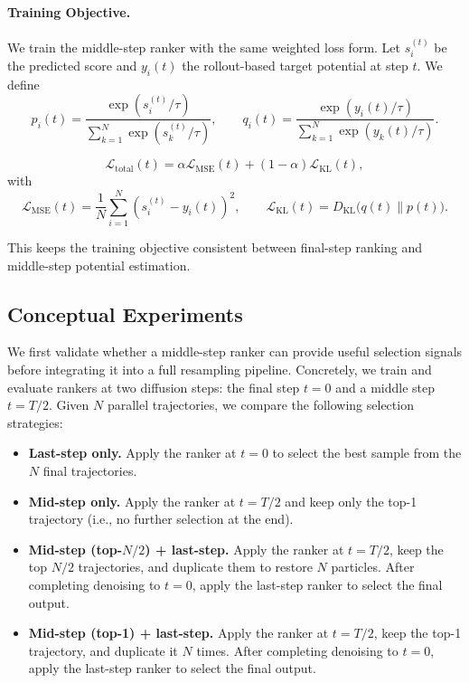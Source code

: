 \documentclass{article}
\begin{document}
\paragraph{Training Objective.}
We train the middle-step ranker with the same weighted loss form. Let $s_i^{(t)}$ be the predicted score and $y_i(t)$ the rollout-based target potential at step $t$. We define
\begin{equation}
    p_i(t) = \frac{\exp(s_i^{(t)} / \tau)}{\sum_{k=1}^{N} \exp(s_k^{(t)} / \tau)}, \qquad
    q_i(t) = \frac{\exp(y_i(t) / \tau)}{\sum_{k=1}^{N} \exp(y_k(t) / \tau)}.
\end{equation}

\begin{equation}
    \mathcal{L}_{\text{total}}(t) = \alpha \mathcal{L}_{\text{MSE}}(t) + (1-\alpha) \mathcal{L}_{\text{KL}}(t),
\end{equation}
with
\begin{equation}
    \mathcal{L}_{\text{MSE}}(t)=\frac{1}{N}\sum_{i=1}^{N}(s_i^{(t)}-y_i(t))^2, \qquad
    \mathcal{L}_{\text{KL}}(t)=D_{\mathrm{KL}}\bigl(q(t) \| p(t)\bigr).
    \label{eq:kl_loss}
\end{equation}

This keeps the training objective consistent between final-step ranking and middle-step potential estimation.

\subsection{Conceptual Experiments}

We first validate whether a middle-step ranker can provide useful selection signals before integrating it into a full resampling pipeline. Concretely, we train and evaluate rankers at two diffusion steps: the final step $t=0$ and a middle step $t=T/2$. Given $N$ parallel trajectories, we compare the following selection strategies:

\begin{itemize}
    \item \textbf{Last-step only.} Apply the ranker at $t=0$ to select the best sample from the $N$ final trajectories.

    \item \textbf{Mid-step only.} Apply the ranker at $t=T/2$ and keep only the top-1 trajectory (i.e., no further selection at the end).

    \item \textbf{Mid-step (top-$N/2$) + last-step.} Apply the ranker at $t=T/2$, keep the top $N/2$ trajectories, and duplicate them to restore $N$ particles. After completing denoising to $t=0$, apply the last-step ranker to select the final output.

    \item \textbf{Mid-step (top-1) + last-step.} Apply the ranker at $t=T/2$, keep the top-1 trajectory, and duplicate it $N$ times. After completing denoising to $t=0$, apply the last-step ranker to select the final output.
\end{itemize}
\end{document}

